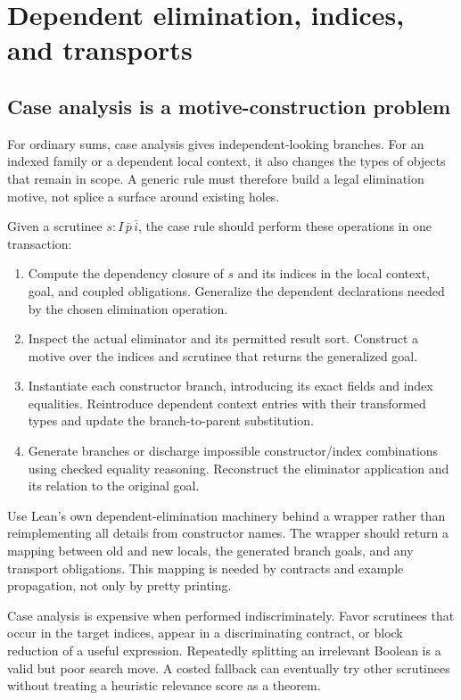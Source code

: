 \section{Dependent elimination, indices, and transports}\label{sec:dependent}

\subsection{Case analysis is a motive-construction problem}

For ordinary sums, case analysis gives independent-looking branches. For an
indexed family or a dependent local context, it also changes the types of
objects that remain in scope. A generic rule must therefore build a legal
elimination motive, not splice a surface  around existing holes.

Given a scrutinee $s:I\,\bar p\,\bar i$, the case rule should perform these
operations in one transaction:
\begin{enumerate}
\item Compute the dependency closure of $s$ and its indices in the local
context, goal, and coupled obligations. Generalize the dependent declarations
needed by the chosen elimination operation.
\item Inspect the actual eliminator and its permitted result sort. Construct a
motive over the indices and scrutinee that returns the generalized goal.
\item Instantiate each constructor branch, introducing its exact fields and
index equalities. Reintroduce dependent context entries with their transformed
types and update the branch-to-parent substitution.
\item Generate branches or discharge impossible constructor/index combinations
using checked equality reasoning. Reconstruct the eliminator application and
its relation to the original goal.
\end{enumerate}

Use Lean's own dependent-elimination machinery behind a wrapper rather than
reimplementing all details from constructor names. The wrapper should return a
mapping between old and new locals, the generated branch goals, and any
transport obligations. This mapping is needed by contracts and example
propagation, not only by pretty printing.

Case analysis is expensive when performed indiscriminately. Favor scrutinees
that occur in the target indices, appear in a discriminating contract, or
block reduction of a useful expression. Repeatedly splitting an irrelevant
Boolean is a valid but poor search move. A costed fallback can eventually try
other scrutinees without treating a heuristic relevance score as a theorem.

